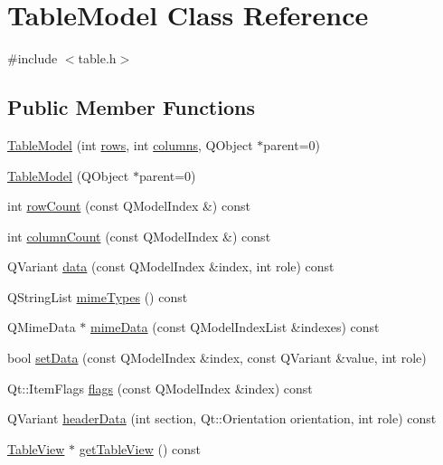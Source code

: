 \hypertarget{classTableModel}{
\section{TableModel Class Reference}
\label{classTableModel}
}


{\ttfamily \#include $<$table.h$>$}

\subsection*{Public Member Functions}
\begin{DoxyCompactItemize}
\item 
\hyperlink{classTableModel_a95196d3e35846be172b6e52c2b40c099}{TableModel} (int \hyperlink{classTableModel_ab55a02518eefc1d6fc1bcf0ea62be849}{rows}, int \hyperlink{classTableModel_a363abf84b86025d76dd5f29c1e255bdd}{columns}, QObject $\ast$parent=0)
\item 
\hyperlink{classTableModel_ad7d9723995888a77fa2242069fe3e67d}{TableModel} (QObject $\ast$parent=0)
\item 
int \hyperlink{classTableModel_a053ac3f027a487a18c991bdc094a88ab}{rowCount} (const QModelIndex \&) const 
\item 
int \hyperlink{classTableModel_a3c00d361175b94462364581c57cd5871}{columnCount} (const QModelIndex \&) const 
\item 
QVariant \hyperlink{classTableModel_ab22a19802ca81ba42e1cec670e864183}{data} (const QModelIndex \&index, int role) const 
\item 
QStringList \hyperlink{classTableModel_a601afd00ae8e83cef022608eb6586a89}{mimeTypes} () const 
\item 
QMimeData $\ast$ \hyperlink{classTableModel_a8b605509eb243a62936d68373bc9a13d}{mimeData} (const QModelIndexList \&indexes) const 
\item 
bool \hyperlink{classTableModel_a6b42f2f951eb350bb7d80cffc0ebeb84}{setData} (const QModelIndex \&index, const QVariant \&value, int role)
\item 
Qt::ItemFlags \hyperlink{classTableModel_ac758b15767be92f2ac9e0c4d958d5662}{flags} (const QModelIndex \&index) const 
\item 
QVariant \hyperlink{classTableModel_a4677a49af807c3b72ca4c1e82971d9ec}{headerData} (int section, Qt::Orientation orientation, int role) const 
\item 
\hyperlink{classTableView}{TableView} $\ast$ \hyperlink{classTableModel_a220cdd35aec84f12a792899a69b615a2}{getTableView} () const 

\end{DoxyCompactItemize}
